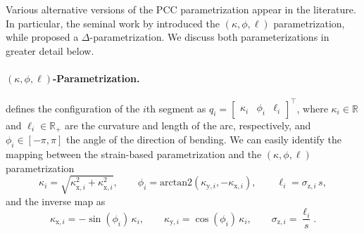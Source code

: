 Various alternative versions of the \gls{PCC} parametrization appear in the literature. In particular, the seminal work by \citet{webster2010design} introduced the $(\kappa,\phi,\ell)$ parametrization, while \citet{della2020improved} proposed a $\Delta$-parametrization. We discuss both parameterizations in greater detail below.

\paragraph{$(\kappa,\phi,\ell)$-Parametrization.}
\citet{webster2010design} defines the configuration of the $i$th segment as $q_i = \begin{bmatrix}
    \kappa_i & \phi_i & \ell_i
\end{bmatrix}^\top$, where $\kappa_i \in \mathbb{R}$ and $\ell_i \in \mathbb{R}_+$ are the curvature and length of the arc, respectively, and $\phi_i \in [-\pi,\pi]$ the angle of the direction of bending.
We can easily identify the mapping between the strain-based parametrization and the $(\kappa,\phi,\ell)$ parametrization
\begin{equation}
    \kappa_i = \sqrt{\kappa_{\mathrm{x},i}^2 + \kappa_{\mathrm{x},i}^2},
    \qquad
    \phi_i = \mathrm{arctan2}(\kappa_{\mathrm{y},i}, -\kappa_{\mathrm{x},i}),
    \qquad
    \ell_i = \sigma_{\mathrm{z},i} \, s,
\end{equation}
and the inverse map as
\begin{equation}
    \kappa_{\mathrm{x},i} = -\sin(\phi_i) \, \kappa_i,
    \qquad
    \kappa_{\mathrm{y},i} = \cos(\phi_i) \, \kappa_i,
    \qquad
    \sigma_{\mathrm{z},i} = \frac{\ell_i}{s}.
\end{equation}

